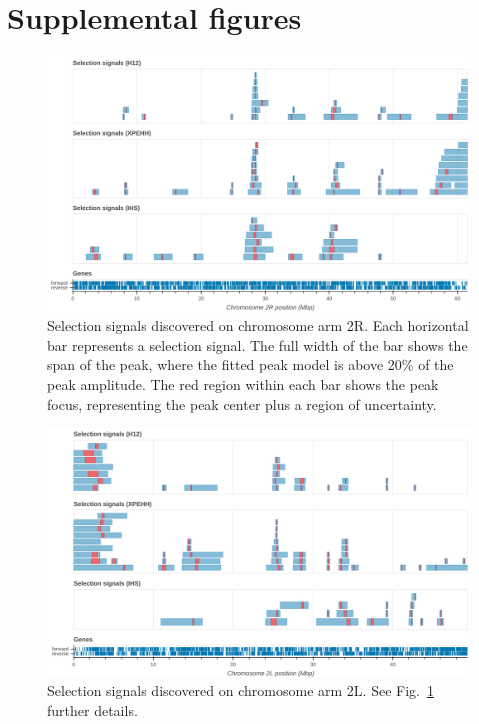 \documentclass[a4paper,11pt,abstracton,hidelinks]{scrartcl}
\begin{document}
\section{Supplemental figures}\label{sec:supplemental-figures}


\begin{figure}[h!]
\centering
\includegraphics[width=1.1\textwidth,center]{artwork/chapter5/signals_2R.png}
\caption{Selection signals discovered on chromosome arm 2R.
%
Each horizontal bar represents a selection signal.
%
The full width of the bar shows the span of the peak, where the fitted peak model is above 20\% of the peak amplitude.
%
The red region within each bar shows the peak focus, representing the peak center plus a region of uncertainty.
%
}
\label{fig:signals_2R}
\end{figure}


\clearpage
\begin{figure}[h!]
\centering
\includegraphics[width=1.1\textwidth,center]{artwork/chapter5/signals_2L.png}
\caption{Selection signals discovered on chromosome arm 2L.
%
See Fig.~\ref{fig:signals_2R} further details.
}
\label{fig:signals_2L}
\end{figure}
\end{document}
